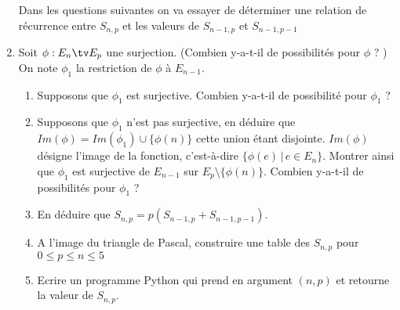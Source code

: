 \begin{exercice}
\begin{enumerate}
Dans les questions suivantes on va essayer de déterminer une relation de récurrence entre $S_{n,p}$ et les valeurs de $S_{n-1,p}$ et $S_{n-1,p-1}$
\item Soit $\phi : E_n \tv E_p$  une surjection. (Combien y-a-t-il de possibilités pour $\phi$ ? ) On note $\phi_1$ la restriction de $\phi$ à $E_{n-1}$. 
\begin{enumerate}
\item Supposons que $\phi_1$ est surjective. Combien y-a-t-il de possibilité pour $\phi_1$ ? 
\item Supposons que $\phi_1$ n'est pas surjective, en déduire que $Im(\phi) = Im(\phi_1) \cup \{ \phi(n)\}$ cette union étant disjointe. $Im(\phi)$ désigne l'image  de la fonction, c'est-à-dire $\{ \phi(e) \, |\, e\in E_n\}$. Montrer ainsi que $\phi_1$ est surjective de $E_{n-1}$ sur $E_p\setminus\{ \phi(n)\}$. Combien y-a-t-il de possibilités pour $\phi_1$ ?
\item En déduire que $S_{n,p}= p(S_{n-1,p} +S_{n-1,p-1})$.
\item A l'image du triangle de Pascal, construire une table des $S_{n,p}$ pour $0\leq p\leq n \leq 5$
\item Ecrire un programme Python qui prend en argument $(n,p)$ et retourne la valeur de $S_{n,p}$.
\end{enumerate}

\end{enumerate}
\end{exercice}


